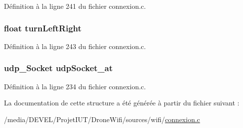 Définition à la ligne 241 du fichier connexion.\-c.

\hypertarget{structardrone_ad2830725ca67f509c4dd63caf152e8f6}{
\subsubsection[{turn\-Left\-Right}]{\setlength{\rightskip}{0pt plus 5cm}float turn\-Left\-Right}}\label{structardrone_ad2830725ca67f509c4dd63caf152e8f6}


Définition à la ligne 243 du fichier connexion.\-c.

\hypertarget{structardrone_acb3a788ee7164c5350b4bfd7d8312772}{
\subsubsection[{udp\-Socket\-\_\-at}]{\setlength{\rightskip}{0pt plus 5cm}udp\-\_\-\-Socket udp\-Socket\-\_\-at}}\label{structardrone_acb3a788ee7164c5350b4bfd7d8312772}


Définition à la ligne 234 du fichier connexion.\-c.



La documentation de cette structure a été générée à partir du fichier suivant \-:\begin{DoxyCompactItemize}
\item 
/media/\-D\-E\-V\-E\-L/\-Projet\-I\-U\-T/\-Drone\-Wifi/sources/wifi/\hyperlink{connexion_8c}{connexion.\-c}\end{DoxyCompactItemize}
